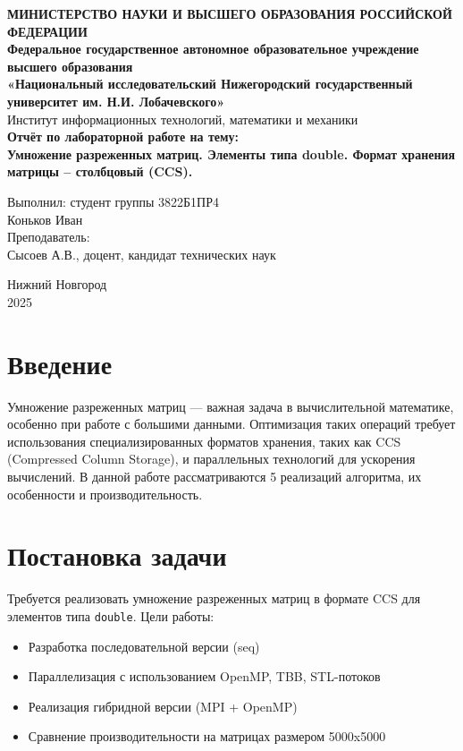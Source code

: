 \documentclass[12pt]{article}
\begin{document}
\begin{titlepage}
\begin{center}
\textbf{МИНИСТЕРСТВО НАУКИ И ВЫСШЕГО ОБРАЗОВАНИЯ РОССИЙСКОЙ ФЕДЕРАЦИИ} \\[0.5cm]
\textbf{Федеральное государственное автономное образовательное учреждение высшего образования} \\[0.5cm]
\textbf{«Национальный исследовательский Нижегородский государственный университет им. Н.И. Лобачевского»} \\[0.5cm]
Институт информационных технологий, математики и механики \\
\vfill
{\Large
\textbf{Отчёт по лабораторной работе на тему:} \\[0.5cm]
\textbf{Умножение разреженных матриц. Элементы типа double. Формат хранения матрицы – столбцовый (CCS).} \\
}
\vfill
\begin{flushright}
Выполнил: студент группы 3822Б1ПР4 \\
Коньков Иван \\
\vspace{1cm}
Преподаватель: \\
Сысоев А.В., доцент, кандидат технических наук \\
\end{flushright}
\vfill
Нижний Новгород \\
2025
\end{center}
\end{titlepage}

\tableofcontents
\newpage

\section{Введение}
Умножение разреженных матриц — важная задача в вычислительной математике, особенно при работе с большими данными. 
Оптимизация таких операций требует использования специализированных форматов хранения, таких как CCS (Compressed Column Storage), 
и параллельных технологий для ускорения вычислений. В данной работе рассматриваются 5 реализаций алгоритма, их особенности и производительность.

\section{Постановка задачи}
Требуется реализовать умножение разреженных матриц в формате CCS для элементов типа \texttt{double}. 
Цели работы:
\begin{itemize}
    \item Разработка последовательной версии (seq)
    \item Параллелизация с использованием OpenMP, TBB, STL-потоков
    \item Реализация гибридной версии (MPI + OpenMP)
    \item Сравнение производительности на матрицах размером 5000x5000
\end{itemize}
\end{document}
